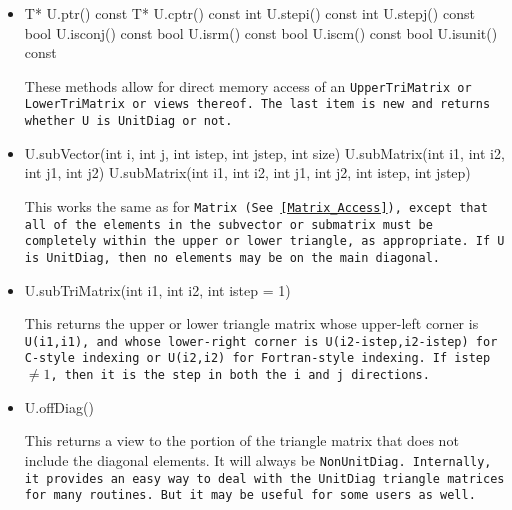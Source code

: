\begin{itemize}
\item
\begin{tmvcode}
T* U.ptr()
const T* U.cptr() const
int U.stepi() const
int U.stepj() const
bool U.isconj() const
bool U.isrm() const
bool U.iscm() const
bool U.isunit() const
\end{tmvcode}
These methods allow for direct memory access of an \tt{UpperTriMatrix} or \tt{LowerTriMatrix} or views thereof. 
The last item is new and returns whether \tt{U} is \tt{UnitDiag} or not.

\item
\begin{tmvcode}
U.subVector(int i, int j, int istep, int jstep, int size)
U.subMatrix(int i1, int i2, int j1, int j2)
U.subMatrix(int i1, int i2, int j1, int j2, int istep, int jstep)
\end{tmvcode}
This works the same as for \tt{Matrix}
(See \ref{Matrix_Access}),
except that all of the elements in the 
subvector or submatrix must be completely within the upper or lower triangle, as
appropriate.  If \tt{U} is \tt{UnitDiag}, then no elements may be on the 
main diagonal.

\item
\begin{tmvcode}
U.subTriMatrix(int i1, int i2, int istep = 1)
\end{tmvcode}
This returns the upper or lower triangle matrix whose upper-left
corner is \tt{U(i1,i1)}, and whose lower-right corner is 
\tt{U(i2-istep,i2-istep)} for C-style indexing or \tt{U(i2,i2)} 
for Fortran-style indexing.  If \tt{istep} $\neq 1$, then it is the 
step in both the \tt{i} and \tt{j} directions.

\item
\begin{tmvcode}
U.offDiag()
\end{tmvcode}
This returns a view to the portion of the triangle matrix that does not include
the diagonal elements.  It will always be \tt{NonUnitDiag}.
Internally, it provides an easy way to deal with the \tt{UnitDiag} triangle matrices
for many routines.  But it may be useful for some users as well.


\end{itemize}
